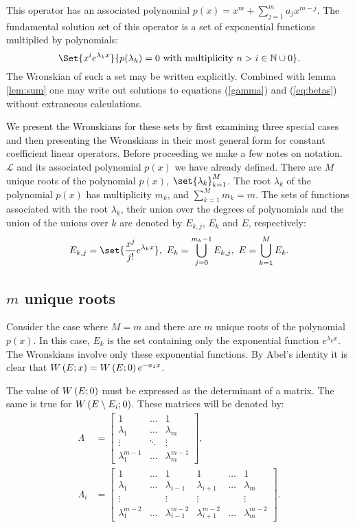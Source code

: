 \documentclass{article}
\begin{document}
This operator has an associated polynomial $p(x) = x^m + \sum_{j=1}^{m} a_j x^{m-j}$.
The fundamental solution set of this operator is a set of exponential functions multiplied by polynomials:
\begin{equation*}
\Set{x^{i} e^{\lambda_k x}}{p(\lambda_k) = 0 \ \text{with multiplicity } n>i \in \mathbb{N} \cup 0} .
\end{equation*}
The Wronskian of such a set may be written explicitly.
Combined with lemma \ref{lem:sum} one may write out solutions to equations (\ref{gamma}) and (\ref{eq:betas}) without extraneous calculations.

We present the Wronskians for these sets by first examining three special cases and then presenting the Wronskians in their most general form for constant coefficient linear operators.
Before proceeding we make a few notes on notation.
$\mathcal{L}$ and its associated polynomial $p(x)$ we have already defined.
There are $M$ unique roots of the polynomial $p(x)$, $\set{\lambda_k}_{k=1}^M$.
The root $\lambda_k$ of the polynomial $p(x)$ has multiplicity $m_k$, and $\sum_{k=1}^M m_k = m$.
The sets of functions associated with the root $\lambda_k$, their union over the degrees of polynomials and the union of the unions over $k$ are denoted by $E_{k,j}$, $E_k$ and $E$, respectively:
\begin{equation*}
E_{k,j} = \set{\Poly{j} e^{\lambda_k x}}, \ E_k = \bigcup_{j=0}^{m_k - 1} E_{k,j}, \ E = \bigcup_{k=1}^M E_k .
\end{equation*}

\subsection{$m$ unique roots}

Consider the case where $M=m$ and there are $m$ unique roots of the polynomial $p(x)$.
In this case, $E_k$ is the set containing only the exponential function $e^{\lambda_k x}$.
The Wronskians involve only these exponential functions.
By Abel's identity it is clear that $W \left ( E ; x \right ) = W \left ( E ; 0 \right ) e^{-a_1 x}$.

The value of $W \left ( E ; 0 \right )$ must be expressed as the determinant of a matrix.
The same is true for $W \left ( E \setminus{E_i} ; 0 \right )$.
These matrices will be denoted by:
\begin{align*}
\Lambda & = \begin{bmatrix} 1 & \dots & 1 \\ \lambda_1 & \dots & \lambda_m \\ \vdots & \ddots & \vdots \\ \lambda_1^{m-1} & \dots & \lambda_m^{m-1} \end{bmatrix}, \\
\Lambda_i & = \begin{bmatrix} 1 & \dots & 1 & 1 & \dots & 1 \\ \lambda_1 & \dots & \lambda_{i-1} & \lambda_{i+1} & \dots & \lambda_m \\ \vdots & & \vdots & \vdots & & \vdots \\ \lambda_1^{m-2} & \dots & \lambda_{i-1}^{m-2} & \lambda_{i+1}^{m-2} & \dots & \lambda_m^{m-2} \end{bmatrix} .
\end{align*}
\end{document}
